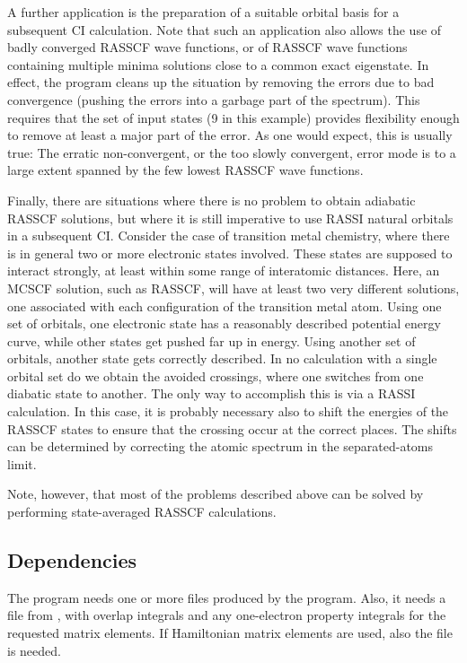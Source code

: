 A further application is the preparation of a suitable orbital basis
for a subsequent CI calculation. Note that such an application also
allows the use of badly converged RASSCF wave functions, or of RASSCF
wave functions containing multiple minima solutions close to a common
exact eigenstate. In effect, the  program cleans up the situation
by removing the errors due to bad convergence (pushing the errors into
a garbage part of the spectrum). This requires that the set of input
states (9 in this example) provides flexibility enough to remove at
least a major part of the error. As one would expect, this is usually
true: The erratic non-{}convergent, or the too slowly convergent, error
mode is to a large extent spanned by the few lowest RASSCF wave
functions.

Finally, there are situations where there is no problem to obtain
adiabatic RASSCF solutions, but where it is still imperative to use
RASSI natural orbitals in a subsequent CI. Consider the case of
transition metal chemistry, where there is in general two or more
electronic states involved. These states are supposed to interact
strongly, at least within some range of interatomic distances. Here,
an MCSCF solution, such as RASSCF, will have at least two very
different solutions, one associated with each configuration of the
transition metal atom. Using one set of orbitals, one electronic state
has a reasonably described potential energy curve, while other states
get pushed far up in energy. Using another set of orbitals, another
state gets correctly described. In no calculation with a single
orbital set do we obtain the avoided crossings, where one switches
from one diabatic state to another. The only way to accomplish this is
via a RASSI calculation. In this case, it is probably necessary also to
shift the energies of the RASSCF states to ensure that the crossing
occur at the correct places. The shifts can be determined by
correcting the atomic spectrum in the separated-{}atoms limit.

Note, however, that most of the problems described above can be
solved by performing state-averaged RASSCF calculations.


\subsection{Dependencies}
\label{UG:sec:rassi_dependencies}
The  program needs one or more  files produced
by the  program. Also, it needs a  file from
, with overlap integrals and any one-electron
property integrals for the requested matrix elements. If Hamiltonian
matrix elements are used, also the  file is needed.

